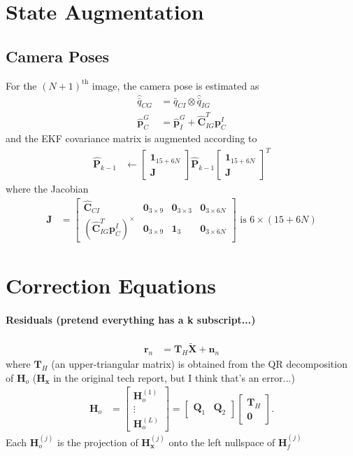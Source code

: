 \documentclass[10pt,letterpaper,fleqn,oneside]{article}
\newcommand{\nl}{\\[0.5em]}
\def\Vec#1{\mathbf{#1}} %
\newcommand{\bbm}{\begin{bmatrix}}
\newcommand{\ebm}{\end{bmatrix}}
\begin{document}
\section{State Augmentation}
\subsection{Camera Poses}
For the $\left(N+1\right)^{\text{th}}$ image, the camera pose is estimated as
\begin{align}
\hat{\bar{q}}_{C G} &= \left.\bar{q}_{C I}\right.\otimes\left.\hat{\bar{q}}_{I G}\right. \nl
\hat{\Vec{p}}^G_C &= \left.\hat{\Vec{p}}^G_I\right. + \hat{\Vec{C}}_{I G}^T \left.\Vec{p}^I_C\right.
\end{align}
and the EKF covariance matrix is augmented according to
\begin{align}
\hat{\Vec{P}}_{k-1} &\leftarrow \bbm \Vec{1}_{15+6N}  \nl \Vec{J}\ebm \hat{\Vec{P}}_{k-1} \bbm \Vec{1}_{15+6N}  \nl \Vec{J}\ebm^T
\end{align}
where the Jacobian
\begin{align}
\Vec{J} &= \bbm \hat{\Vec{C}}_{C I} & \Vec{0}_{3\times9} & \Vec{0}_{3\times3} & \Vec{0}_{3\times6N} \nl
							\left(\hat{\Vec{C}}_{I G}^T \left.\Vec{p}^I_C\right.\right)^\times & \Vec{0}_{3\times9} & \Vec{1}_3 & \Vec{0}_{3\times6N}
				\ebm \text{ is } 6\times\left(15 + 6N\right)
\end{align}

\newpage
\section{Correction Equations}
\paragraph{Residuals (pretend everything has a k subscript...)}
\begin{align}
	\Vec{r}_n &= \Vec{T}_H \widetilde{\Vec{X}} + \Vec{n}_n
\end{align}
where $\Vec{T}_H$ (an upper-triangular matrix) is obtained from the QR decomposition of $\Vec{H}_o$ ($\Vec{H}_\Vec{x}$ in the original tech report, but I think that's an error...)
\begin{align}
\Vec{H}_o &= \bbm	\Vec{H}^{(1)}_o \nl \vdots \nl \Vec{H}^{(L)}_o \ebm
 = \bbm \Vec{Q}_1 & \Vec{Q}_2 \ebm \bbm \Vec{T}_H \nl \Vec{0} \ebm.
\end{align}
Each $\Vec{H}^{(j)}_o$ is the projection of $\Vec{H}^{(j)}_\Vec{x}$ onto the left nullspace of $\Vec{H}^{(j)}_f$
\end{document}
